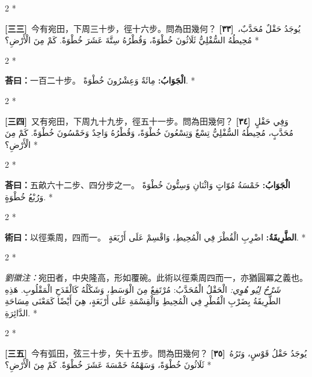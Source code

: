 \documentclass[11pt,a4paper]{article}
\newcommand{\ar}[1]{\arabicfont\beginR #1\endR}
\newcommand{\problemnum}[1]{\textbf{[\ignorespaces#1\unskip]}}
\newenvironment{bilingual}{%
  \begin{paracol}{2}%
  \switchcolumn[0]*%
}{%
  \end{paracol}%
}
\newcommand{\cnline}[1]{\switchcolumn[0]\noindent #1 \switchcolumn[1]}
\newcommand{\arline}[1]{\noindent\ar{#1} \switchcolumn[0]*}
\newenvironment{prob bilingual}{%
  \begin{paracol}{2}%
  \switchcolumn[0]*%
}{%
  \end{paracol}%
  \vspace{0.3em}%
}
\begin{document}
\begin{bilingual}
\cnline{\problemnum{三三}\, 今有宛田，下周三十步，徑十六步。問為田幾何？}
\arline{\problemnum{٣٣}\, يُوجَدُ حَقْلٌ مُحَدَّبٌ، مُحِيطُهُ السُّفْلِيُّ ثَلَاثُونَ خُطْوَةً، وَقُطْرُهُ سِتَّةَ عَشَرَ خُطْوَةً. كَمْ مِنَ الْأَرْضِ؟}
\end{bilingual}

\begin{bilingual}
\cnline{\textcolor{answercolor}{\textbf{荅曰：}}一百二十步。}
\arline{\textcolor{answercolor}{\textbf{الْجَوَابُ:}} مِائَةٌ وَعِشْرُونَ خُطْوَةً.}
\end{bilingual}

\begin{bilingual}
\cnline{\problemnum{三四}\, 又有宛田，下周九十九步，徑五十一步。問為田幾何？}
\arline{\problemnum{٣٤}\, وَفِي حَقْلٍ مُحَدَّبٍ، مُحِيطُهُ السُّفْلِيُّ تِسْعٌ وَتِسْعُونَ خُطْوَةً، وَقُطْرُهُ وَاحِدٌ وَخَمْسُونَ خُطْوَةً. كَمْ مِنَ الْأَرْضِ؟}
\end{bilingual}

\begin{bilingual}
\cnline{\textcolor{answercolor}{\textbf{荅曰：}}五畝六十二步、四分步之一。}
\arline{\textcolor{answercolor}{\textbf{الْجَوَابُ:}} خَمْسَةُ مُوّاتٍ وَاثْنَانِ وَسِتُّونَ خُطْوَةً وَرُبْعُ خُطْوَةٍ.}
\end{bilingual}

\begin{bilingual}
\cnline{%
\textcolor{methodcolor}{\textbf{術曰：}}以徑乘周，四而一。
}
\arline{%
\textcolor{methodcolor}{\textbf{الطَّرِيقَةُ:}} اضْرِبِ الْقُطْرَ فِي الْمُحِيطِ، وَاقْسِمْ عَلَى أَرْبَعَةٍ.
}
\end{bilingual}

\begin{bilingual}
\cnline{%
\textcolor{commentarycolor}{\small\textit{劉徽注：}}宛田者，中央隆高，形如覆碗。此術以徑乘周四而一，亦猶圓冪之義也。
}
\arline{%
\textcolor{commentarycolor}{\small\textit{شَرْحُ لِيُو هُوِي:}} الْحَقْلُ الْمُحَدَّبُ: مُرْتَفِعٌ مِنَ الْوَسَطِ، وَشَكْلُهُ كَالْقَدَحِ الْمَقْلُوبِ. هَذِهِ الطَّرِيقَةُ بِضَرْبِ الْقُطْرِ فِي الْمُحِيطِ وَالْقِسْمَةِ عَلَى أَرْبَعَةٍ، هِيَ أَيْضًا كَمَعْنَى مِسَاحَةِ الدَّائِرَةِ.
}
\end{bilingual}

\begin{bilingual}
\cnline{\problemnum{三五}\, 今有弧田，弦三十步，矢十五步。問為田幾何？}
\arline{\problemnum{٣٥}\, يُوجَدُ حَقْلُ قَوْسٍ، وَتَرُهُ ثَلَاثُونَ خُطْوَةً، وَسَهْمُهُ خَمْسَةَ عَشَرَ خُطْوَةً. كَمْ مِنَ الْأَرْضِ؟}
\end{bilingual}
\end{document}
